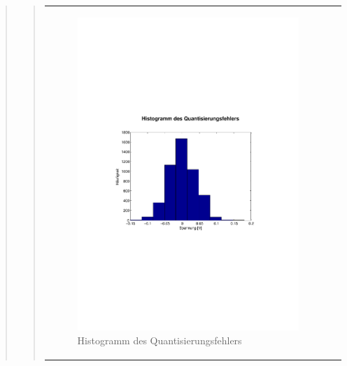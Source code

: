 \begin{quote}
\begin{quote}
\begin{center}
\begin{tabular}{ll}
                \begin{minipage}{0.6\textwidth}
                    \begin{figure}[H]
                        \includegraphics[scale=0.55, trim = 1.6cm 9cm 1.6cm
                        8.5cm, clip]
                        {./Bilder/drei100_Histogramm}
                          \caption{Histogramm des Quantisierungsfehlers}
                    \end{figure}
                \end{minipage}
            
            \end{tabular}
        \end{center}
        
        
        
    \end{quote}  %
         	
\end{quote}%

